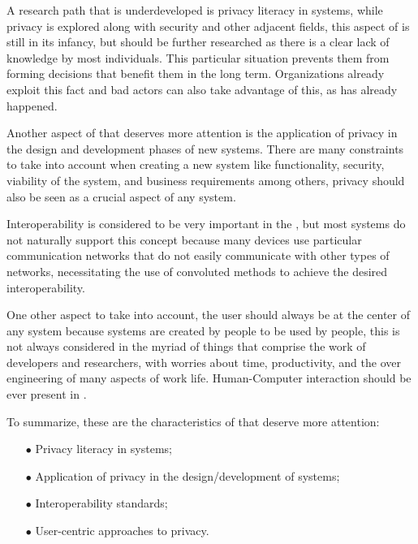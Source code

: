 A research path that is underdeveloped is privacy literacy in \hyperlink{\acronym}{\acronym} systems,
while privacy is explored along with security and other adjacent fields, this aspect of \hyperlink{\acronym}{\acronym}
is still in its infancy, but should be further researched as there is a
clear lack of knowledge by most individuals. This particular situation prevents
them from forming decisions that benefit them in the long term. Organizations
already exploit this fact and bad actors can also take advantage of this, as
has already happened.

Another aspect of \hyperlink{\acronym}{\acronym} that deserves more attention
is the application of privacy in the design and development phases of new
\hyperlink{\acronym}{\acronym} systems. There are many constraints to take into account when creating a
new system like functionality, security, viability of the system, and business
requirements among others, privacy should also be seen as a crucial aspect
of any system.

Interoperability is considered to be very important in the \hyperlink{\acronym}{\acronym},
but most systems do not naturally support this concept because many devices use particular
communication networks that do not easily communicate with other types of networks,
necessitating the use of convoluted methods to achieve the desired interoperability.

One other aspect to take into account, the user should always be at the center
of any system because systems are created by people to be used by people, this is not
always considered in the myriad of things that comprise the work of developers
and researchers, with worries about time, productivity, and the over
engineering of many aspects of work life. Human-Computer interaction should
be ever present in \hyperlink{\acronym}{\acronym}.

To summarize, these are the characteristics of \hyperlink{\acronym}{\acronym} that deserve more attention:

\begin{itemize}
    \item[$\bullet$]
    Privacy literacy in \hyperlink{\acronym}{\acronym} systems;
    \item[$\bullet$]
    Application of privacy in the design/development of \hyperlink{\acronym}{\acronym} systems;
    \item[$\bullet$]
    Interoperability standards;
    \item[$\bullet$]
    User-centric approaches to \hyperlink{\acronym}{\acronym} privacy.
\end{itemize}
